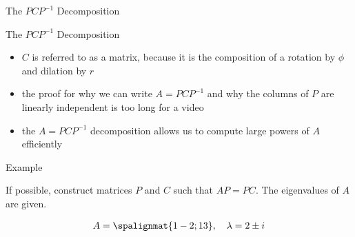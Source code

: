 \begin{frame}{The $ PCP^{-1}$ Decomposition}

    \begin{center}\end{center}
    
    \vspace{4pt}


\end{frame}




\begin{frame}{The $ PCP^{-1}$ Decomposition} 

    \begin{itemize} 
        \item<2-> $C$ is referred to as a  matrix, because it is the composition of a rotation by $\phi$ and dilation by $r$
        \item<3-> the proof for why we can write $A = PCP^{-1}$ and why the columns of $P$ are linearly independent is too long for a video
        \item<4-> the $A=PCP^{-1}$ decomposition allows us to compute large powers of $A$ efficiently
    \end{itemize}

\end{frame}




\begin{frame}{Example} 

    If possible, construct matrices $P$ and $C$ such that $AP = PC$. The eigenvalues of $A$ are given. 
    
    \begin{align*}  
        A =  \spalignmat{ 1  -2 ; 1  3 } , \quad \lambda = 2 \pm i
    \end{align*}

\end{frame}



